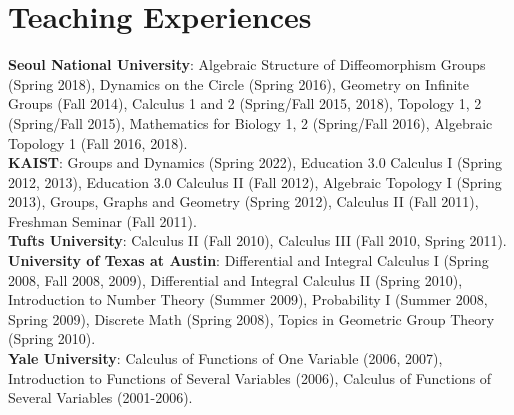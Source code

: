 \documentclass[11pt,a4paper]{article}
\begin{document}
\section*{Teaching Experiences}
\textbf{Seoul National University}: Algebraic Structure of Diffeomorphism Groups (Spring 2018), Dynamics on the Circle (Spring 2016), Geometry on Infinite Groups (Fall 2014), Calculus 1 and 2 (Spring/Fall 2015, 2018), Topology 1, 2 (Spring/Fall 2015), Mathematics for Biology 1, 2 (Spring/Fall 2016), Algebraic Topology 1 (Fall 2016, 2018). \\
\textbf{KAIST}: Groups and Dynamics (Spring 2022), Education 3.0 Calculus I (Spring 2012, 2013), Education 3.0 Calculus II (Fall 2012), Algebraic Topology I (Spring 2013), Groups, Graphs and Geometry (Spring 2012), Calculus II (Fall 2011), Freshman Seminar (Fall 2011). \\
\textbf{Tufts University}: Calculus II (Fall 2010), Calculus III (Fall 2010, Spring 2011). \\
\textbf{University of Texas at Austin}: Differential and Integral Calculus I (Spring 2008, Fall 2008, 2009), Differential and Integral Calculus II (Spring 2010), Introduction to Number Theory (Summer 2009), Probability I (Summer 2008, Spring 2009), Discrete Math (Spring 2008), Topics in Geometric Group Theory (Spring 2010). \\
\textbf{Yale University}: Calculus of Functions of One Variable (2006, 2007), Introduction to Functions of Several Variables (2006), Calculus of Functions of Several Variables (2001-2006).
\end{document}
